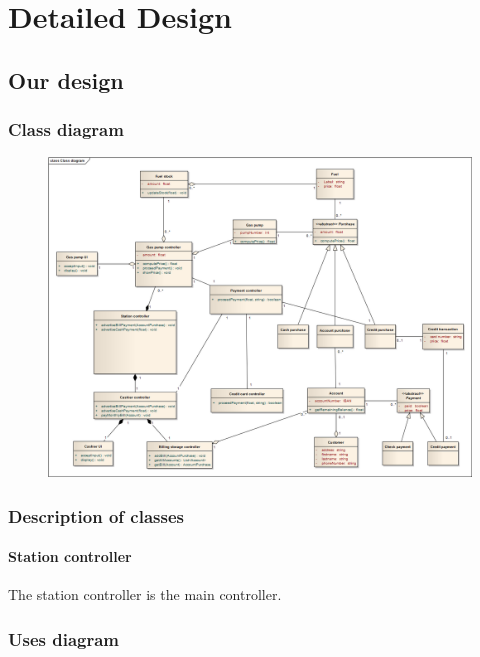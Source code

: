 \section{Detailed Design}
\subsection{Our design}
\subsubsection{Class diagram}

\begin{figure}[H]
 \centering
 \includegraphics[width=\textwidth]{../ClassDiagram.png}
\end{figure}

\subsubsection{Description of classes}

\paragraph{Station controller}
The station controller is the main controller.


\subsubsection{Uses diagram}

